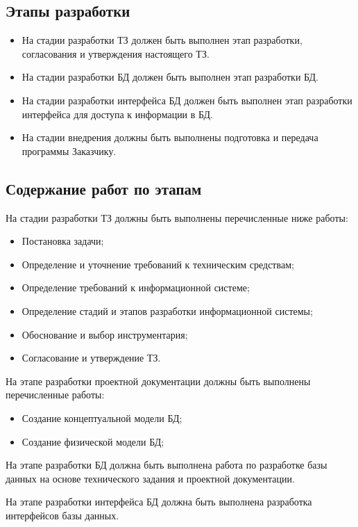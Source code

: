   \subsection{Этапы разработки}
  \begin{itemize}
    \item На стадии разработки ТЗ должен быть выполнен этап разработки, согласования и утверждения настоящего ТЗ.
    \item На стадии разработки БД должен быть выполнен этап разработки БД.
    \item На стадии разработки интерфейса БД должен быть выполнен этап разработки интерфейса для доступа к информации в БД.
    \item На стадии внедрения должны быть выполнены подготовка и передача программы Заказчику.
  \end{itemize}
  
  \subsection{Содержание работ по этапам}
    На стадии разработки ТЗ должны быть выполнены перечисленные ниже работы:
      \begin{itemize}
        \item Постановка задачи;
        \item Определение и уточнение требований к техническим средствам;
        \item Определение требований к информационной системе;
        \item Определение стадий и этапов разработки информационной системы;
        \item Обоснование и выбор инструментария;
        \item Согласование и утверждение ТЗ.
      \end{itemize}
      
    На этапе разработки проектной документации должны быть выполнены перечисленные работы:
      \begin{itemize}
        \item Создание концептуальной модели БД;
        \item Создание физической модели БД;
      \end{itemize}
      
    На этапе разработки БД должна быть выполнена работа по разработке базы данных на основе технического задания и проектной документации.

    На этапе разработки интерфейса БД должна быть выполнена разработка интерфейсов базы данных.

